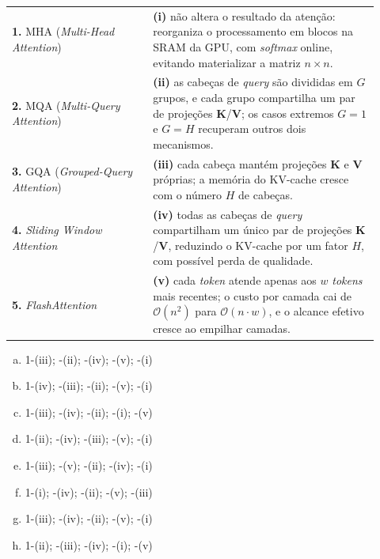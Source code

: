 \documentclass[11pt,a4paper]{article}
\begin{document}
\begin{enumerate}[1)]
\begin{center}
\begin{tabular}{p{0.35\linewidth} p{0.57\linewidth}}
\textbf{1.} MHA (\textit{Multi-Head Attention}) & \textbf{(i)} não altera o resultado da atenção: reorganiza o processamento em blocos na SRAM da GPU, com \textit{softmax} online, evitando materializar a matriz $n \times n$. \\
\textbf{2.} MQA (\textit{Multi-Query Attention}) & \textbf{(ii)} as cabeças de \textit{query} são divididas em $G$ grupos, e cada grupo compartilha um par de projeções $\mathbf{K}$/$\mathbf{V}$; os casos extremos $G = 1$ e $G = H$ recuperam outros dois mecanismos. \\
\textbf{3.} GQA (\textit{Grouped-Query Attention}) & \textbf{(iii)} cada cabeça mantém projeções $\mathbf{K}$ e $\mathbf{V}$ próprias; a memória do KV-cache cresce com o número $H$ de cabeças. \\
\textbf{4.} \textit{Sliding Window Attention} & \textbf{(iv)} todas as cabeças de \textit{query} compartilham um único par de projeções $\mathbf{K}$/$\mathbf{V}$, reduzindo o KV-cache por um fator $H$, com possível perda de qualidade. \\
\textbf{5.} \textit{FlashAttention} & \textbf{(v)} cada \textit{token} atende apenas aos $w$ \textit{tokens} mais recentes; o custo por camada cai de $\mathcal{O}(n^2)$ para $\mathcal{O}(n \cdot w)$, e o alcance efetivo cresce ao empilhar camadas. \\
\end{tabular}
\end{center}

\begin{enumerate}[a)]
    \item 1-(iii); -(ii); -(iv); -(v); -(i)
    \item 1-(iv); -(iii); -(ii); -(v); -(i)
    \item 1-(iii); -(iv); -(ii); -(i); -(v)
    \item 1-(ii); -(iv); -(iii); -(v); -(i)
    \item 1-(iii); -(v); -(ii); -(iv); -(i)
    \item 1-(i); -(iv); -(ii); -(v); -(iii)
    \item 1-(iii); -(iv); -(ii); -(v); -(i)
    \item 1-(ii); -(iii); -(iv); -(i); -(v)
\end{enumerate}


\end{enumerate}
\end{document}
